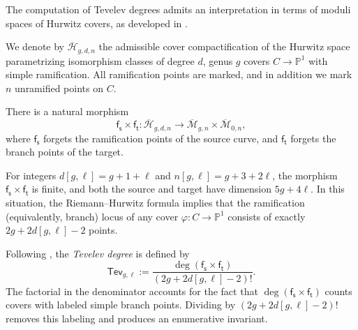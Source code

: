 \documentclass[11pt,reqno]{amsart}
\theoremstyle{definition}
\newcommand{\bP}{\mathds{P}}
\newcommand{\calM}{\mathcal{M}}
\newcommand{\Mbar}{\overline{\calM}}
\newcommand\Mgnbar[1]{\Mbar_{#1}}
\newcommand\Adm[1]{ \mathcal{ \overline{H}}_{#1}}
\newcommand{\ft}{\mathsf{f_t}}
\newcommand{\fs}{\mathsf{f_s}}
\newcommand{\Tev}{{\mathsf{Tev}}}
\begin{document}
The computation of Tevelev degrees admits an interpretation in terms of moduli spaces of
Hurwitz covers, as developed in \cite{CPS:Tevdeg}.

We denote by $\Adm{g,d,n}$ the admissible cover compactification \cite{HM:ac} of the Hurwitz
space parametrizing isomorphism classes of degree $d$, genus $g$ covers
$C \to \bP^1$ with simple ramification. All ramification points are marked, and in addition
we mark $n$ unramified points on $C$.

There is a natural morphism
\begin{equation}
    \label{eq:forgfinitemap}
    \fs \times \ft \colon \Adm{g,d,n} \longrightarrow
    \Mgnbar{g,n} \times \Mgnbar{0,n},
\end{equation}
where $\fs$ forgets the ramification points of the source curve, and $\ft$ forgets the branch
points of the target.

For integers $d[g,\ell] = g+1+\ell$ and $n[g,\ell] = g+3+2\ell$, the morphism $\fs \times \ft$ is
finite, and both the source and target have dimension $5g + 4\ell$. In this situation, the
Riemann--Hurwitz formula implies that the ramification (equivalently, branch) locus of any
cover $\varphi \colon C \to \bP^1$ consists of exactly $2g + 2d[g,\ell] - 2$ points.

Following \cite[Section~1.2]{CPS:Tevdeg}, the \emph{Tevelev degree} is defined by
\begin{equation}
    \label{def:algTev}
    \Tev_{g,\ell}
    := \frac{\deg(\fs \times \ft)}{(2g + 2d[g,\ell] - 2)!}.
\end{equation}
The factorial in the denominator accounts for the fact that $\deg(\fs \times \ft)$ counts
covers with labeled simple branch points. Dividing by
$(2g + 2d[g,\ell] - 2)!$ removes this labeling and produces an enumerative invariant.
\end{document}
